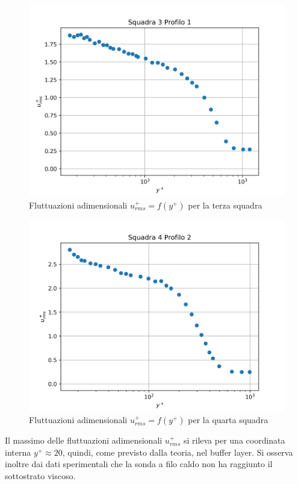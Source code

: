 \begin{figure}[H]
    \centering
    \includegraphics[width=.85\textwidth]{images/9/sq3p1+_rms.png}
    \caption{Fluttuazioni adimensionali $u^+_{rms}=f(y^+)$ per la terza squadra}
\end{figure}

\begin{figure}[H]
    \centering
    \includegraphics[width=.85\textwidth]{images/9/sq4p2+_rms.png}
    \caption{Fluttuazioni adimensionali $u^+_{rms}=f(y^+)$ per la quarta squadra}
\end{figure}

\noindent Il massimo delle fluttuazioni adimensionali $u^+_{rms}$ si rileva per una coordinata interna $y^+\approx20$, quindi, come previsto dalla teoria, nel buffer layer. Si osserva inoltre dai dati sperimentali che la sonda a filo caldo non ha raggiunto il sottostrato viscoso.

